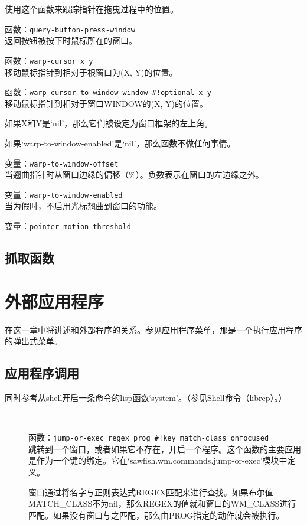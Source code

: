 \documentclass{book}
\begin{document}
\begin{CJK*}{UTF8}{gbsn}
\begin{description}
使用这个函数来跟踪指针在拖曳过程中的位置。
\item[-{}-] 函数：\verb|query-button-press-window|\\
返回按钮被按下时鼠标所在的窗口。
\item[-{}-] 函数：\verb|warp-cursor x y|\\
移动鼠标指针到相对于根窗口为(X, Y)的位置。
\item[-{}-] 函数：\verb|warp-cursor-to-window window #!optional x y|\\
移动鼠标指针到相对于窗口WINDOW的(X, Y)的位置。

如果X和Y是`nil'，那么它们被设定为窗口框架的左上角。

如果`warp-to-window-enabled'是`nil'，那么函数不做任何事情。
\item[-{}-] 变量：\verb|warp-to-window-offset|\\
当翘曲指针时从窗口边缘的偏移（\%）。负数表示在窗口的左边缘之外。
\item[-{}-] 变量：\verb|warp-to-window-enabled|\\
当为假时，不启用光标翘曲到窗口的功能。
\item[-{}-] 变量：\verb|pointer-motion-threshold|\\

\end{description}
\section{抓取函数}
\chapter{外部应用程序}
在这一章中将讲述和外部程序的关系。参见应用程序菜单，那是一个执行应用程序的弹出式菜单。
\section{应用程序调用}
同时参考从shell开启一条命令的lisp函数`system'。（参见Shell命令（librep）。）
\begin{description}
\item[-{}-] 函数：\verb|jump-or-exec regex prog #!key match-class onfocused|\\
跳转到一个窗口，或者如果它不存在，开启一个程序。这个函数的主要应用是作为一个键的绑定。它在`sawfish.wm.commands.jump-or-exec'模块中定义。

窗口通过将名字与正则表达式REGEX匹配来进行查找。如果布尔值MATCH\_CLASS不为nil，那么REGEX的值就和窗口的WM\_CLASS进行匹配。如果没有窗口与之匹配，那么由PROG指定的动作就会被执行。


\end{description}
\end{CJK*}
\end{document}
